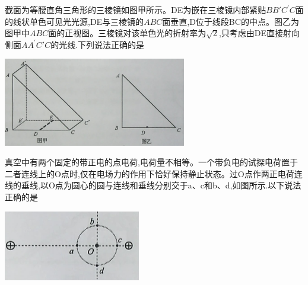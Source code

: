 \newpage
{}
\begin{questions}[30s]

\question[4]截面为等腰直角三角形的三棱镜如图甲所示。DE为嵌在三棱镜内部紧贴$BB'C^\prime C$面的线状单色可见光光源,DE与三棱镜的$ABC$面垂直,D位于线段BC的中点。图乙为图甲中$ABC$面的正视图。三棱镜对该单色光的折射率为$\sqrt{2}$,只考虑由DE直接射向侧面$AA^\prime C'C$的光线.下列说法正确的是\begin{center}\includegraphics[width=8cm]{img/image6.png}\end{center}
\begin{solution}{4cm}

\end{solution}



\question[4]真空中有两个固定的带正电的点电荷,电荷量不相等。一个带负电的试探电荷置于二者连线上的O点时,仅在电场力的作用下恰好保持静止状态。过O点作两正电荷连线的垂线,以O点为圆心的圆与连线和垂线分别交于a、c和b、d,如图所示.以下说法正确的是\begin{center}\includegraphics[]{img/image7.png}\end{center}
\begin{solution}{4cm}

\end{solution}



\end{questions}
